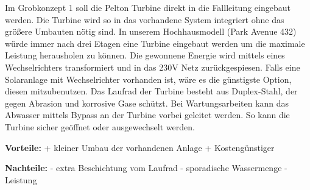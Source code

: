 Im Grobkonzept 1 soll die Pelton Turbine direkt in die Fallleitung eingebaut werden. Die Turbine wird so in das vorhandene System integriert ohne das größere Umbauten nötig sind.
In unserem Hochhausmodell (Park Avenue 432) würde immer nach drei Etagen eine Turbine eingebaut werden um die maximale Leistung herausholen zu können. 
Die gewonnene Energie wird mittels eines Wechselrichters transformiert und in das 230V Netz zurückgespiesen. Falls eine Solaranlage mit Wechselrichter vorhanden ist, wäre es die günstigste Option, diesen mitzubenutzen. Das Laufrad der Turbine besteht aus Duplex-Stahl, der gegen Abrasion und korrosive Gase schützt.
Bei Wartungsarbeiten kann das Abwasser mittels Bypass an der Turbine vorbei geleitet werden. So kann die Turbine sicher geöffnet oder ausgewechselt werden.

\textbf{Vorteile:}												\newline
+	kleiner Umbau der vorhandenen Anlage			\newline
+	Kostengünstiger											\newline
	
\textbf{Nachteile:}												\newline
- 	extra Beschichtung vom Laufrad					\newline
-	sporadische Wassermenge							\newline
-	Leistung														\newline


